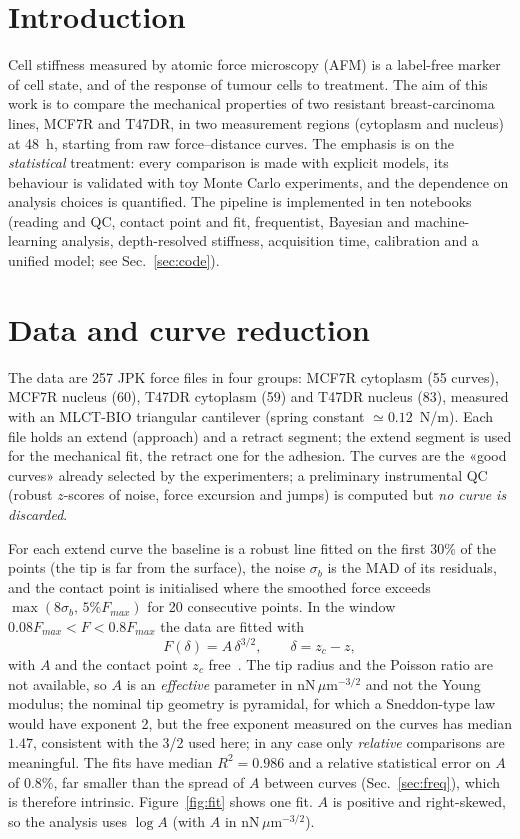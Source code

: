 \documentclass[reprint,nofootinbib,amsmath,amssymb,aps,floatfix]{revtex4-2}
\begin{document}
\section{Introduction}
Cell stiffness measured by atomic force microscopy (AFM) is a label-free marker of cell state, and of the response of
tumour cells to treatment. The aim of this work is to compare the mechanical properties of two resistant
breast-carcinoma lines, MCF7R and T47DR, in two measurement regions (cytoplasm and nucleus) at 48~h, starting from raw
force--distance curves. The emphasis is on the \emph{statistical} treatment: every comparison is made with explicit
models, its behaviour is validated with toy Monte Carlo experiments, and the dependence on analysis choices is
quantified. The pipeline is implemented in ten notebooks (reading and QC, contact point and fit, frequentist,
Bayesian and machine-learning analysis, depth-resolved stiffness, acquisition time, calibration and a unified model; see Sec.~\ref{sec:code}).

\section{Data and curve reduction}\label{sec:data}
The data are 257 JPK force files in four groups: MCF7R cytoplasm (55 curves), MCF7R nucleus (60), T47DR cytoplasm (59)
and T47DR nucleus (83), measured with an MLCT-BIO triangular cantilever (spring constant $\simeq0.12$~N/m). Each file
holds an extend (approach) and a retract segment; the extend segment is used for the mechanical fit, the retract one for
the adhesion. The curves are the «good curves» already selected by the experimenters; a preliminary instrumental QC
(robust $z$-scores of noise, force excursion and jumps) is computed but \emph{no curve is discarded}.

For each extend curve the baseline is a robust line fitted on the first 30\% of the points (the tip is far from the
surface), the noise $\sigma_b$ is the MAD of its residuals, and the contact point is initialised where the smoothed force exceeds
$\max(8\sigma_b,\,5\%F_{max})$ for 20 consecutive points. In the window $0.08F_{max}<F<0.8F_{max}$ the data are fitted with
\begin{equation}
F(\delta)=A\,\delta^{3/2},\qquad \delta=z_c-z,
\end{equation}
with $A$ and the contact point $z_c$ free~\cite{hertz1882}. The tip radius and the Poisson ratio are not available, so $A$ is an
\emph{effective} parameter in nN\,$\mu$m$^{-3/2}$ and not the Young modulus; the nominal tip geometry is pyramidal, for which a
Sneddon-type law~\cite{sneddon1965} would have exponent 2, but the free exponent measured on the curves has median $1.47$, consistent with the 3/2 used here; in any case only \emph{relative} comparisons are meaningful. The fits
have median $R^2=0.986$ and a relative statistical error on $A$ of 0.8\%, far smaller than the spread of $A$ between curves
(Sec.~\ref{sec:freq}), which is therefore intrinsic. Figure~\ref{fig:fit} shows one fit.
$A$ is positive and right-skewed, so the analysis uses $\log A$ (with $A$ in nN\,$\mu$m$^{-3/2}$).
\end{document}

